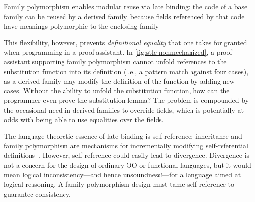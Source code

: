 
Family polymorphism enables modular reuse via late binding:
the code of a base family can be reused by a derived family,
because fields referenced by that code have meanings polymorphic to the
enclosing family.

This flexibility, however, prevents \emph{definitional equality}
that one takes for granted when programming in a proof assistant.
In \cref{fig:stlc-nonmechanized}, a proof assistant supporting family
polymorphism cannot unfold references to the substitution function into its definition (i.e., a pattern match against four cases), %
as a derived family may modify the definition of the function by adding
new cases.
Without the ability to unfold the substitution function, how can the
programmer even prove the substitution lemma?
%
The problem is compounded by the occasional need in derived families to override fields,
which is potentially at odds with being able to use equalities over the fields.



The language-theoretic essence of late binding is self reference;
inheritance and family polymorphism are mechanisms for
incrementally modifying self-referential definitions~\cite{cook1990inheritance}.
However, self reference could easily lead to divergence.
Divergence is not a concern for the design of ordinary OO or
functional languages, but it would mean logical inconsistency---and
hence unsoundness!---for a language aimed at logical reasoning.
A family-polymorphism design must tame self reference to guarantee consistency.

